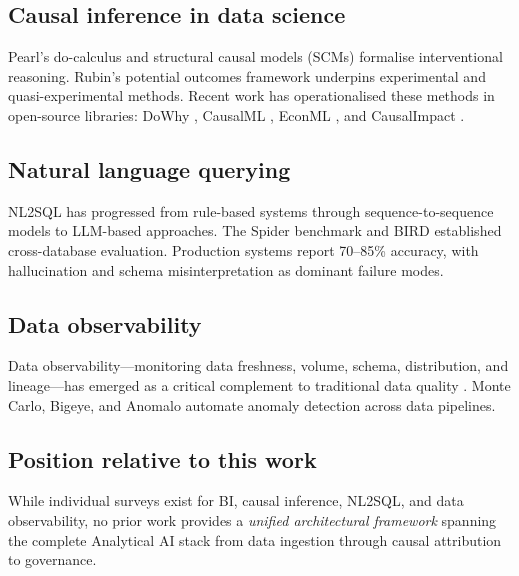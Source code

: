\documentclass[preprint,12pt,authoryear]{elsarticle}
\theoremstyle{definition}
\begin{document}
\subsection{Causal inference in data science}

Pearl's do-calculus and structural causal models (SCMs) \citep{pearl2009causality} formalise interventional reasoning. Rubin's potential outcomes framework \citep{rubin2005causal} underpins experimental and quasi-experimental methods. Recent work has operationalised these methods in open-source libraries: DoWhy \citep{sharma2020dowhy}, CausalML \citep{chen2020causalml}, EconML \citep{econml2019}, and CausalImpact \citep{brodersen2015causalimpact}.

\subsection{Natural language querying}

NL2SQL has progressed from rule-based systems through sequence-to-sequence models to LLM-based approaches. The Spider benchmark \citep{yu2018spider} and BIRD \citep{li2024bird} established cross-database evaluation. Production systems report 70--85\% accuracy, with hallucination and schema misinterpretation as dominant failure modes.

\subsection{Data observability}

Data observability---monitoring data freshness, volume, schema, distribution, and lineage---has emerged as a critical complement to traditional data quality \citep{moses2022data,greatexpectations2023}. Monte Carlo, Bigeye, and Anomalo automate anomaly detection across data pipelines.

\subsection{Position relative to this work}

While individual surveys exist for BI, causal inference, NL2SQL, and data observability, no prior work provides a \emph{unified architectural framework} spanning the complete Analytical AI stack from data ingestion through causal attribution to governance.

\end{document}
